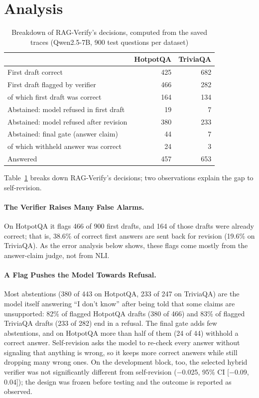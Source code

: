 \documentclass{svproc}
\begin{document}
\section{Analysis}
\begin{table}[htb]
\caption{Breakdown of RAG-Verify's decisions, computed from the saved traces (Qwen2.5-7B, 900 test questions per dataset)}
\label{tab:trace}
\centering
\begin{tabular}{lrr}
\toprule
 & HotpotQA & TriviaQA \\
\midrule
First draft correct & 425 & 682 \\
First draft flagged by verifier & 466 & 282 \\
\quad of which first draft was correct & 164 & 134 \\
Abstained: model refused in first draft & 19 & 7 \\
Abstained: model refused after revision & 380 & 233 \\
Abstained: final gate (answer claim) & 44 & 7 \\
\quad of which withheld answer was correct & 24 & 3 \\
Answered & 457 & 653 \\
\bottomrule
\end{tabular}
\end{table}

Table~\ref{tab:trace} breaks down RAG-Verify's decisions; two observations explain the gap to self-revision.

\paragraph{The Verifier Raises Many False Alarms.} On HotpotQA it flags 466 of 900 first drafts, and 164 of those drafts were already correct; that is, 38.6\% of correct first answers are sent back for revision (19.6\% on TriviaQA). As the error analysis below shows, these flags come mostly from the answer-claim judge, not from NLI.

\paragraph{A Flag Pushes the Model Towards Refusal.} Most abstentions (380 of 443 on HotpotQA, 233 of 247 on TriviaQA) are the model itself answering ``I don't know'' after being told that some claims are unsupported: 82\% of flagged HotpotQA drafts (380 of 466) and 83\% of flagged TriviaQA drafts (233 of 282) end in a refusal. The final gate adds few abstentions, and on HotpotQA more than half of them (24 of 44) withhold a correct answer. Self-revision asks the model to re-check every answer without signaling that anything is wrong, so it keeps more correct answers while still dropping many wrong ones. On the development block, too, the selected hybrid verifier was not significantly different from self-revision ($-$0.025, 95\% CI [$-$0.09, 0.04]); the design was frozen before testing and the outcome is reported as observed.
\end{document}
